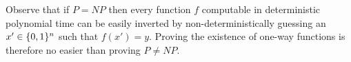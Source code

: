 Observe that if $P = NP$ then every function $f$ computable in deterministic
polynomial time can be easily inverted by non-deterministically guessing an
$x' \in \{0,1\}^{n}$ 
such that $f(x') = y$. Proving the existence of one-way functions is therefore no easier
than proving $P \neq NP$.
%
%
%
%
